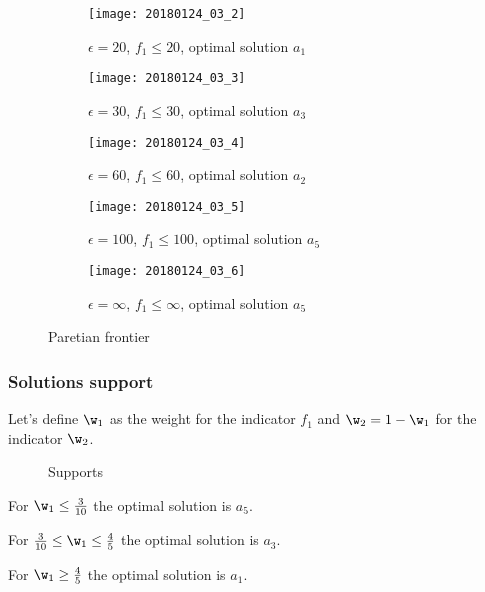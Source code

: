 \documentclass[\main/main.tex]{subfiles}
\begin{document}
\begin{figure}
  \begin{subfigure}{0.32\textwidth}
    \texttt{[image: 20180124\_03\_2]}
    \caption{$\epsilon=20$, $f_1 \leq 20$, optimal solution $a_1$}
  \end{subfigure}
  \begin{subfigure}{0.32\textwidth}
    \texttt{[image: 20180124\_03\_3]}
    \caption{$\epsilon=30$, $f_1 \leq 30$, optimal solution $a_3$}
  \end{subfigure}
  \begin{subfigure}{0.32\textwidth}
    \texttt{[image: 20180124\_03\_4]}
    \caption{$\epsilon=60$, $f_1 \leq 60$, optimal solution $a_2$}
  \end{subfigure}
  \begin{subfigure}{0.32\textwidth}
    \texttt{[image: 20180124\_03\_5]}
    \caption{$\epsilon=100$, $f_1 \leq 100$, optimal solution $a_5$}
  \end{subfigure}
  \begin{subfigure}{0.32\textwidth}
    \texttt{[image: 20180124\_03\_6]}
    \caption{$\epsilon=\infty$, $f_1 \leq \infty$, optimal solution $a_5$}
  \end{subfigure}
  \caption{Paretian frontier}
\end{figure}

\subsubsection*{Solutions support}
Let's define $\w_1$ as the weight for the indicator $f_1$ and $\w_2 = 1-\w_1$ for the indicator $\w_2$.

\begin{figure}
  \caption{Supports}
\end{figure}

For $\w_1 \leq \frac{3}{10}$ the optimal solution is $a_5$.

For $\frac{3}{10} \leq \w_1 \leq \frac{4}{5}$ the optimal solution is $a_3$.

For $\w_1 \geq \frac{4}{5}$ the optimal solution is $a_1$.
\end{document}
